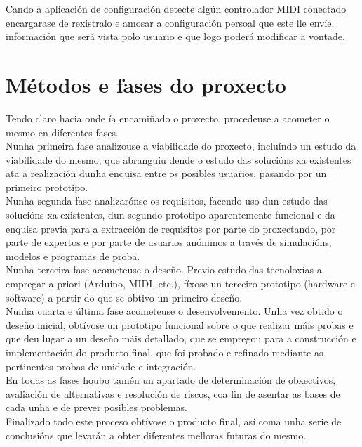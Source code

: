  Cando a aplicación de configuración detecte algún controlador MIDI conectado
 encargarase de rexistralo e amosar a configuración persoal que este lle envíe,
 información que será vista polo usuario e que logo poderá modificar a vontade.
 
\section{Métodos e fases do proxecto}

 Tendo claro hacia onde ía encamiñado o proxecto, procedeuse a acometer o mesmo
 en diferentes fases. \\

 Nunha primeira fase analizouse a viabilidade do proxecto, incluíndo un estudo
 da viabilidade do mesmo, que abranguiu dende o estudo das solucións xa
 existentes ata a realización dunha enquisa entre os posibles usuarios, pasando
 por un primeiro prototipo. \\

 Nunha segunda fase analizarónse os requisitos, facendo uso dun estudo das
 solucións xa existentes, dun segundo prototipo aparentemente funcional e da
 enquisa previa para a extracción de requisitos por parte do proxectando, por
 parte de expertos e por parte de usuarios anónimos a través de simulacións,
 modelos e programas de proba. \\

 Nunha terceira fase acometeuse o deseño. Previo estudo das tecnoloxías a
 empregar a priori (Arduino, MIDI, etc.), fíxose un terceiro prototipo
 (hardware e software) a partir do que se obtivo un primeiro deseño.\\

 Nunha cuarta e última fase acometeuse o desenvolvemento. Unha vez obtido o
 deseño inicial, obtívose un prototipo funcional sobre o que realizar máis
 probas e que deu lugar a un deseño máis detallado, que se empregou para a
 construcción e implementación do producto final, que foi probado e refinado
 mediante as pertinentes probas de unidade e integración. \\

 En todas as fases houbo tamén un apartado de determinación de obxectivos,
 avaliación de alternativas e resolución de riscos, coa fin de asentar as bases
 de cada unha e de prever posibles problemas. \\

 Finalizado todo este proceso obtívose o producto final, así coma unha serie de
 conclusións que levarán a obter diferentes melloras futuras do mesmo.

